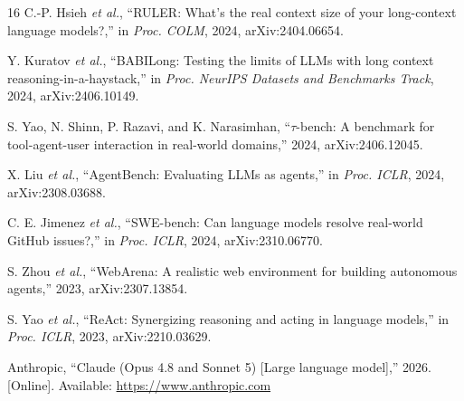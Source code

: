 \documentclass[journal]{IEEEtran}
\begin{document}
\begin{thebibliography}{16}
C.-P. Hsieh \emph{et al.}, ``RULER: What's the real context size of your
long-context language models?,'' in \emph{Proc. COLM}, 2024,
arXiv:2404.06654.

Y. Kuratov \emph{et al.}, ``BABILong: Testing the limits of LLMs with long
context reasoning-in-a-haystack,'' in \emph{Proc. NeurIPS Datasets and
Benchmarks Track}, 2024, arXiv:2406.10149.

S. Yao, N. Shinn, P. Razavi, and K. Narasimhan, ``$\tau$-bench: A benchmark
for tool-agent-user interaction in real-world domains,'' 2024,
arXiv:2406.12045.

X. Liu \emph{et al.}, ``AgentBench: Evaluating LLMs as agents,'' in
\emph{Proc. ICLR}, 2024, arXiv:2308.03688.

C. E. Jimenez \emph{et al.}, ``SWE-bench: Can language models resolve
real-world GitHub issues?,'' in \emph{Proc. ICLR}, 2024, arXiv:2310.06770.

S. Zhou \emph{et al.}, ``WebArena: A realistic web environment for building
autonomous agents,'' 2023, arXiv:2307.13854.

S. Yao \emph{et al.}, ``ReAct: Synergizing reasoning and acting in language
models,'' in \emph{Proc. ICLR}, 2023, arXiv:2210.03629.

Anthropic, ``Claude (Opus 4.8 and Sonnet 5) [Large language model],''
2026. [Online]. Available: \url{https://www.anthropic.com}

\end{thebibliography}
\end{document}
